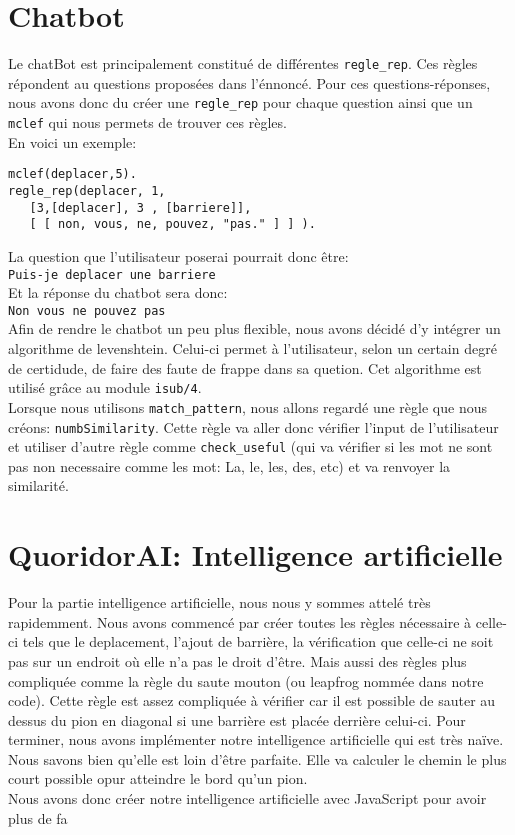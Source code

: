 \documentclass{article}
\begin{document}
\section{Chatbot}
Le chatBot est principalement constitué de différentes \texttt{regle\_rep}. Ces règles répondent au questions proposées dans l'énnoncé. Pour ces questions-réponses, nous avons donc du créer une \texttt{regle\_rep} pour chaque question ainsi que un \texttt{mclef} qui nous permets de trouver ces règles.
\\
En voici un exemple:
\begin{verbatim}
mclef(deplacer,5).
regle_rep(deplacer, 1,
   [3,[deplacer], 3 , [barriere]],
   [ [ non, vous, ne, pouvez, "pas." ] ] ).
\end{verbatim}
La question que l'utilisateur poserai pourrait donc être:
\\
\texttt{Puis-je deplacer une barriere}
\\
Et la réponse du chatbot sera donc:
\\
\texttt{Non vous ne pouvez pas}
\\
Afin de rendre le chatbot un peu plus flexible, nous avons décidé d'y intégrer un algorithme de levenshtein. Celui-ci permet à l'utilisateur, selon un certain degré de certidude, de faire des faute de frappe dans sa quetion.
Cet algorithme est utilisé grâce au module \texttt{isub/4}.
\\
Lorsque nous utilisons \texttt{match\_pattern}, nous allons regardé une règle que nous créons: \texttt{numbSimilarity}. Cette règle va aller donc vérifier l'input de l'utilisateur et utiliser d'autre règle comme \texttt{check\_useful} (qui va vérifier si les mot ne sont pas non necessaire comme les mot: La, le, les, des, etc) et va renvoyer la similarité.
\pagebreak
\section{QuoridorAI: Intelligence artificielle}
Pour la partie intelligence artificielle, nous nous y sommes attelé très rapidemment.
Nous avons commencé par créer toutes les règles nécessaire à celle-ci tels que le deplacement, l'ajout de barrière, la vérification que celle-ci ne soit pas sur un endroit où elle n'a pas le droit d'être. Mais aussi des règles plus compliquée comme la règle du saute mouton (ou leapfrog nommée dans notre code). Cette règle est assez compliquée à vérifier car il est possible de sauter au dessus du pion en diagonal si une barrière est placée derrière celui-ci.
Pour terminer, nous avons implémenter notre intelligence artificielle qui est très naïve. Nous savons bien qu'elle est loin d'être parfaite. Elle va calculer le chemin le plus court possible opur atteindre le bord qu'un pion.
\\
Nous avons donc créer notre intelligence artificielle avec JavaScript pour avoir plus de fa
\pagebreak
\end{document}
